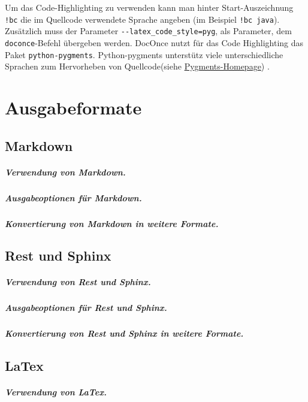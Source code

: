 \documentclass[%
oneside,                 %
final,                   %
chapterprefix=true,      %
open=right,              %
10pt]{book}
\begin{document}
Um das Code-Highlighting zu verwenden kann man hinter Start-Auszeichnung \Verb?!bc? die im Quellcode verwendete Sprache angeben (im Beispiel \Verb?!bc java?). Zusätzlich muss der Parameter \Verb!--latex_code_style=pyg!, als Parameter, dem \texttt{doconce}-Befehl übergeben werden. DocOnce nutzt für das Code Highlighting das Paket \texttt{python-pygments}. Python-pygments unterstütz viele unterschiedliche Sprachen zum Hervorheben von Quellcode(siehe \href{{http://pygments.org/docs/cmdline/#getting-lexer-names}}{Pygments-Homepage}) .
\chapter{Ausgabeformate}

\section{Markdown}
\paragraph{ Verwendung von Markdown.}
\paragraph{ Ausgabeoptionen für Markdown.}
\paragraph{ Konvertierung von Markdown in weitere Formate.}
\section{Rest und Sphinx}
\paragraph{ Verwendung von Rest und Sphinx.}
\paragraph{ Ausgabeoptionen für Rest und Sphinx.}
\paragraph{ Konvertierung von Rest und Sphinx in weitere Formate.}
\section{LaTex}
\paragraph{ Verwendung von LaTex.}
\end{document}
